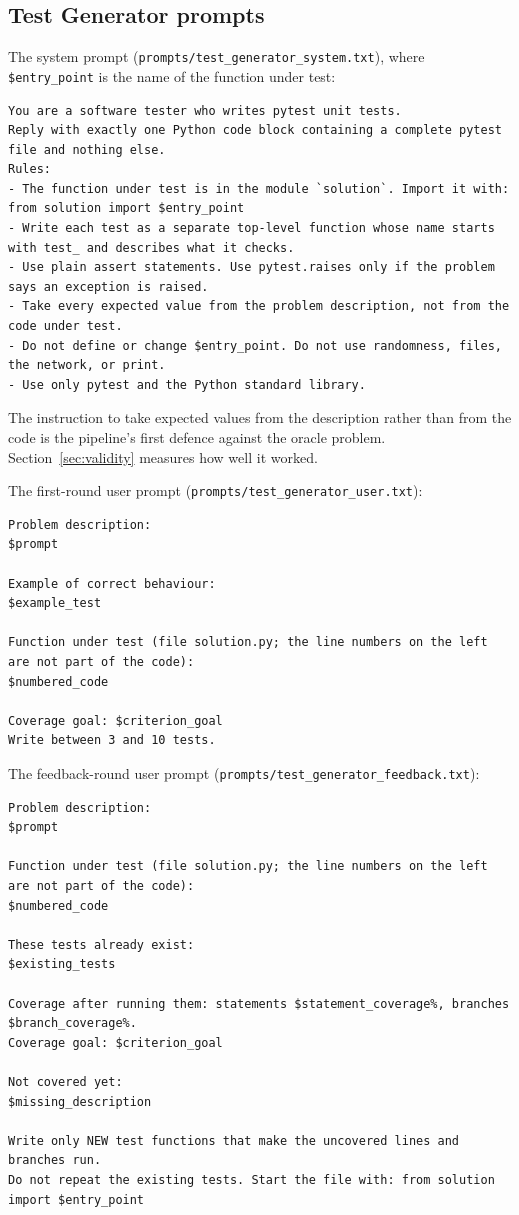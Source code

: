 \documentclass[11pt,a4paper]{article}
\begin{document}
\subsection{Test Generator prompts}

The system prompt (\texttt{prompts/test\_generator\_system.txt}), where \texttt{\$entry\_point} is the name of
the function under test:

\begin{lstlisting}[style=plain]
You are a software tester who writes pytest unit tests.
Reply with exactly one Python code block containing a complete pytest file and nothing else.
Rules:
- The function under test is in the module `solution`. Import it with: from solution import $entry_point
- Write each test as a separate top-level function whose name starts with test_ and describes what it checks.
- Use plain assert statements. Use pytest.raises only if the problem says an exception is raised.
- Take every expected value from the problem description, not from the code under test.
- Do not define or change $entry_point. Do not use randomness, files, the network, or print.
- Use only pytest and the Python standard library.
\end{lstlisting}

The instruction to take expected values from the description rather than from the code is the pipeline's first
defence against the oracle problem. Section~\ref{sec:validity} measures how well it worked.

The first-round user prompt (\texttt{prompts/test\_generator\_user.txt}):

\begin{lstlisting}[style=plain]
Problem description:
$prompt

Example of correct behaviour:
$example_test

Function under test (file solution.py; the line numbers on the left are not part of the code):
$numbered_code

Coverage goal: $criterion_goal
Write between 3 and 10 tests.
\end{lstlisting}

The feedback-round user prompt (\texttt{prompts/test\_generator\_feedback.txt}):

\begin{lstlisting}[style=plain]
Problem description:
$prompt

Function under test (file solution.py; the line numbers on the left are not part of the code):
$numbered_code

These tests already exist:
$existing_tests

Coverage after running them: statements $statement_coverage%, branches $branch_coverage%.
Coverage goal: $criterion_goal

Not covered yet:
$missing_description

Write only NEW test functions that make the uncovered lines and branches run.
Do not repeat the existing tests. Start the file with: from solution import $entry_point
\end{lstlisting}
\end{document}
